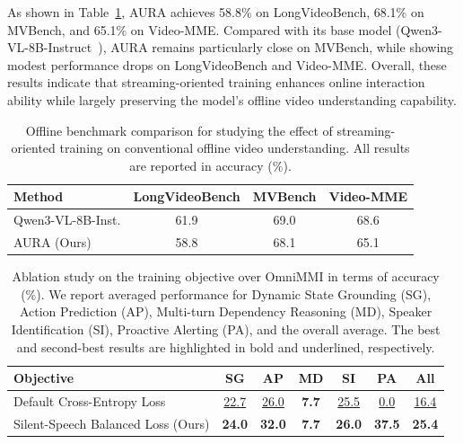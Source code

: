 As shown in Table~\ref{tab:offline_rq1}, AURA achieves 58.8\% on LongVideoBench, 68.1\% on MVBench, and 65.1\% on Video-MME. Compared with its base model (Qwen3-VL-8B-Instruct~\citep{bai2025qwen3}), AURA remains particularly close on MVBench, while showing modest performance drops on LongVideoBench and Video-MME. Overall, these results indicate that streaming-oriented training enhances online interaction ability while largely preserving the model's offline video understanding capability.

\begin{table}[t]\Large
  \renewcommand{\arraystretch}{1.1}
  \caption{Offline benchmark comparison for studying the effect of streaming-oriented training on conventional offline video understanding. All results are reported in accuracy (\%).}
  \label{tab:offline_rq1}
  \footnotesize
  \centering
  \begin{tabular}{l|ccc}
    \toprule
    Method & LongVideoBench & MVBench & Video-MME \\
    \midrule
    Qwen3-VL-8B-Inst. & 61.9 & 69.0 & 68.6 \\
    AURA (Ours)  & 58.8 & 68.1 & 65.1 \\
    \bottomrule
  \end{tabular}
\end{table}

\begin{table}[t]\Large
  \renewcommand{\arraystretch}{1.3}
  \caption{Ablation study on the training objective over OmniMMI in terms of accuracy (\%). We report averaged performance for Dynamic State Grounding (SG), Action Prediction (AP), Multi-turn Dependency Reasoning (MD), Speaker Identification (SI), Proactive Alerting (PA), and the overall average. The best and second-best results are highlighted in bold and underlined, respectively.}
  \label{tab:loss_rq2}
  \centering
  \setlength{\tabcolsep}{4pt}%
  \footnotesize
  \begin{tabular}{l|cccccc}
    \toprule
    Objective & \textbf{SG} & \textbf{AP} & \textbf{MD} & \textbf{SI} & \textbf{PA} & \textbf{All} \\
    \midrule
    Default Cross-Entropy Loss & \underline{22.7} & \underline{26.0} & \textbf{7.7} & \underline{25.5} & \underline{0.0} & \underline{16.4} \\
    Silent-Speech Balanced Loss (Ours) & \textbf{24.0} & \textbf{32.0} & \textbf{7.7} & \textbf{26.0} & \textbf{37.5} & \textbf{25.4} \\
    \bottomrule
  \end{tabular}
\end{table}



